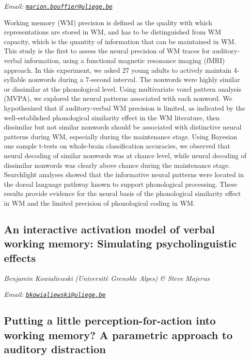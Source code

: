 \documentclass[
  12pt,
]{book}
\begin{document}
\emph{Email: \href{mailto:marion.bouffier@uliege.be}{\nolinkurl{marion.bouffier@uliege.be}}}

Working memory (WM) precision is defined as the quality with which representations are stored in WM, and has to be distinguished from WM capacity, which is the quantity of information that can be maintained in WM. This study is the first to assess the neural precision of WM traces for auditory-verbal information, using a functional magnetic resonance imaging (fMRI) approach. In this experiment, we asked 27 young adults to actively maintain 4-syllable nonwords during a 7-second interval. The nonwords were highly similar or dissimilar at the phonological level. Using multivariate voxel pattern analysis (MVPA), we explored the neural patterns associated with each nonword. We hypothesized that if auditory-verbal WM precision is limited, as indicated by the well-established phonological similarity effect in the WM literature, then dissimilar but not similar nonwords should be associated with distinctive neural patterns during WM, especially during the maintenance stage. Using Bayesian one sample t-tests on whole-brain classification accuracies, we observed that neural decoding of similar nonwords was at chance level, while neural decoding of dissimilar nonwords was clearly above chance during the maintenance stage. Searchlight analyses showed that the informative neural patterns were located in the dorsal language pathway known to support phonological processing. These results provide evidence for the neural basis of the phonological similarity effect in WM and the limited precision of phonological coding in WM.

\hypertarget{an-interactive-activation-model-of-verbal-working-memory-simulating-psycholinguistic-effects}{%
\subsection{An interactive activation model of verbal working memory: Simulating psycholinguistic effects}\label{an-interactive-activation-model-of-verbal-working-memory-simulating-psycholinguistic-effects}}

\emph{Benjamin Kowialiewski (Universitè Grenoble Alpes) \& Steve Majerus}

\emph{Email: \href{mailto:bkowialiewski@uliege.be}{\nolinkurl{bkowialiewski@uliege.be}}}

\hypertarget{putting-a-little-perception-for-action-into-working-memory-a-parametric-approach-to-auditory-distraction}{%
\subsection{Putting a little perception-for-action into working memory? A parametric approach to auditory distraction}\label{putting-a-little-perception-for-action-into-working-memory-a-parametric-approach-to-auditory-distraction}}
\end{document}
